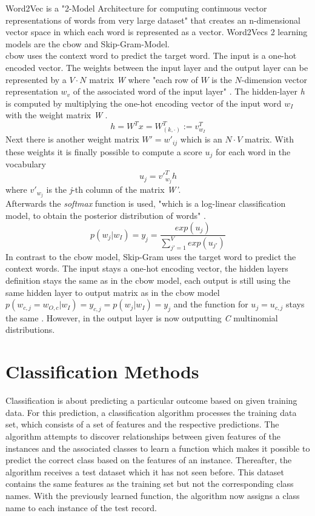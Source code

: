 \documentclass[a4paper, 11pt,titlepage,oneside,openany]{book}
\begin{document}
Word2Vec is a "2-Model Architecture for computing continuous vector representations of words from very large dataset"\cite{effiecientestimation} that creates an n-dimensional vector space in which each word is represented as a vector. Word2Vecs 2 learning models are the \gls{cbow} and Skip-Gram-Model.\\
\noindent \gls{cbow} uses the context word to predict the target word. The input is a one-hot encoded vector. The weights between the input layer and the output layer can be represented by a $V \cdot N$ matrix \textit{W} where "each row of $W$ is the $N$-dimension vector representation $w_v$ of the associated word of the input layer" \cite{word2vecparam}. The hidden-layer \textit{h} is computed by multiplying the one-hot encoding vector of the input word $w_I$ with the weight matrix \textit{W} \cite{word2vecparam}.
\[
h=W^Tx=W_{(k, \cdot)}^{T}:=v_{w_I}^{T}
\] 
Next there is another weight matrix $W'={w'_{ij}}$ which is an $N \cdot V$ matrix. With these weights it is finally possible to compute a score $u_j$ for each word in the vocabulary \cite{word2vecparam}
\[
u_{j}={v'}_{w_j}^{T}h
\] where ${v'}_{w_j}$ is the \textit{j}-th column of the matrix \textit{W'}. \\
\newpage
\noindent Afterwards the \textit{softmax} function is used, "which is a log-linear classification model, to obtain the posterior distribution of words" \cite{word2vecparam}.
\[
p(w_j|w_I)=y_j=\frac{exp(u_j)}{\sum_{j'=1}^V exp(u_{j'})}
\] 
\indent In contrast to the \gls{cbow} model,  Skip-Gram uses the target word to predict the context words. The input stays a one-hot encoding vector, the hidden layers definition stays the same as in the \gls{cbow} model, each output is still using the same hidden layer to output matrix as in the \gls{cbow} model $p(w_{c,j}=w_{O,c}|w_I)=y_{c,j} = p(w_j|w_I)=y_j$ and the function for $u_j=u_{c,j}$ stays the same \cite{word2vecparam}. However, in the output layer is now outputting \textit{C} multinomial distributions.  

\section{Classification Methods}
Classification is about predicting a particular outcome based on given training data. For this prediction, a classification algorithm processes the training data set, which consists of a set of features and the respective predictions. The algorithm attempts to discover relationships between given features  of the instances and the associated classes to learn a function which makes it possible to predict the correct class based on the features of an instance. Thereafter, the algorithm receives a test dataset which it has not seen before. This dataset contains the same features as the training set but not the corresponding class names. With the previously learned function, the algorithm now assigns a class name to each instance  of the test record. \\
\end{document}
